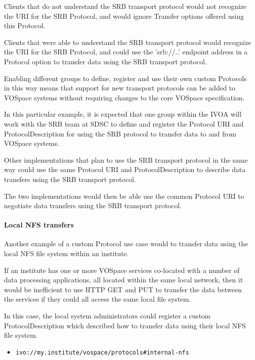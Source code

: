 \documentclass[11pt,a4paper]{ivoa}
\begin{document}
Clients that do not understand the SRB transport protocol would not recognize the URI for the SRB Protocol, and would ignore Transfer options offered using this Protocol.

Clients that were able to understand the SRB transport protocol would recognize the URI for the SRB Protocol, and could use the 'srb://..' endpoint address in a Protocol option to transfer data using the SRB transport protocol.

Enabling different groups to define, register and use their own custom Protocols in this way means that support for new transport protocols can be added to VOSpace systems without requiring changes to the core VOSpace specification.

In this particular example, it is expected that one group within the IVOA will work with the SRB team at SDSC to define and register the Protocol URI and ProtocolDescription for using the SRB protocol to transfer data to and from VOSpace systems.

Other implementations that plan to use the SRB transport protocol in the same way could use the same Protocol URI and ProtocolDescription to describe data transfers using the SRB transport protocol.

The two implementations would then be able use the common Protocol URI to negotiate data transfers using the SRB transport protocol.

\paragraph{Local NFS transfers}

Another example of a custom Protocol use case would to transfer data using the local NFS file system within an institute.

If an institute has one or more VOSpace services co-located with a number of data processing applications, all located within the same local network, then it would be inefficient to use HTTP GET and PUT to transfer the data between the services if they could all access the same local file system.

In this case, the local system administrators could register a custom ProtocolDescription which described how to transfer data using their local NFS file system.

\begin{itemize}
    \item \begin{verbatim}ivo://my.institute/vospace/protocols#internal-nfs\end{verbatim}
\end{itemize}
\end{document}
